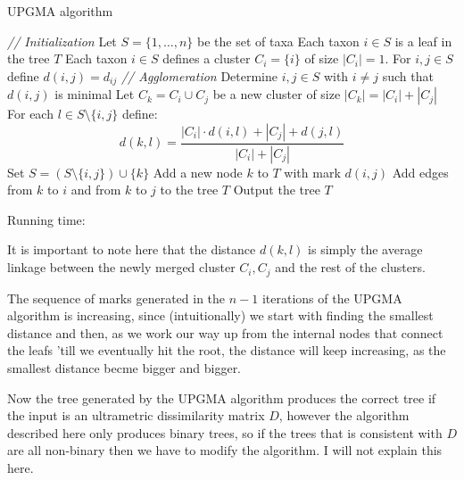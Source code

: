     \begin{algorithm}
        \caption{UPGMA algorithm}\label{alg:upgma}
        \begin{algorithmic}
            \State \textit{// Initialization}
            \State Let $S=\{1,\dots,n\}$ be the set of taxa
            \State Each taxon $i\in S$ is a leaf in the tree $T$
            \State Each taxon $i\in S$ defines a cluster $C_i=\{i\}$ of size 
            $|C_i|=1$.
            \State For $i,j\in S$ define $d(i,j)=d_{ij}$
            \State \textit{// Agglomeration}
                \State Determine $i,j \in S$ with $i \neq j$ such that $d(i,j)$ 
                is minimal
                \State Let $C_k=C_i\cup C_j$ be a new cluster of size $|C_k| = 
                |C_i| + |C_j|$
                \State For each $l \in S \setminus \{i,j\}$ define:
                \begin{equation*}
                    d(k,l) = \frac{|C_i|\cdot d(i,l) + |C_j| + d(j,l)}{|C_i| + 
                    |C_j|}
                \end{equation*}
                \State Set $S=(S \setminus \{i,j\}) \cup \{k\}$
                \State Add a new node $k$ to $T$ with mark $d(i,j)$
                \State Add edges from $k$ to $i$ and from $k$ to $j$ to the 
                tree $T$
            \EndWhile
            \EndProcedure
            \State Output the tree $T$
        \end{algorithmic}
        Running time: 
    \end{algorithm}
    It is important to note here that the distance $d(k,l)$ is simply the 
    average linkage between the newly merged cluster $C_i,C_j$ and the rest of 
    the clusters.
    
    The sequence of marks generated in the $n-1$ iterations of the UPGMA 
    algorithm is increasing, since (intuitionally) we start with finding the 
    smallest distance and then, as we work our way up from the internal nodes 
    that connect the leafs 'till we eventually hit the root, the distance will 
    keep increasing, as the smallest distance becme bigger and bigger.
    
    Now the tree generated by the UPGMA algorithm produces the correct tree if 
    the input is an ultrametric dissimilarity matrix $D$, however the algorithm 
    described here only produces binary trees, so if the trees that is 
    consistent with $D$ are all non-binary then we have to modify the 
    algorithm. I will not explain this here.
    
